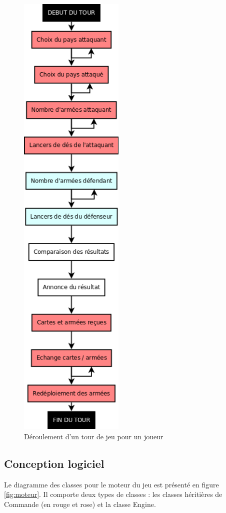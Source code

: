 \begin{figure}[!htbp]
    \centering
    \includegraphics[width=5cm]{Images/tour_jeu.png}
    \caption{Déroulement d'un tour de jeu pour un joueur}
    \label{fig:tour de jeu}
\end{figure}


\newpage
\subsection{Conception logiciel}
Le diagramme des classes pour le moteur du jeu est présenté en figure \ref{fig:moteur}. Il comporte deux types de classes : les classes héritières de Commande (en rouge et rose) et la classe Engine.

